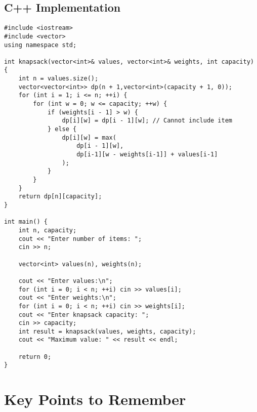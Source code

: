 \documentclass[14pt]{extarticle}
\begin{document}
\subsection{C++ Implementation}
\begin{lstlisting}[style=cpp, caption={0/1 Knapsack in C++}]
#include <iostream>
#include <vector>
using namespace std;

int knapsack(vector<int>& values, vector<int>& weights, int capacity) {
    int n = values.size();
    vector<vector<int>> dp(n + 1,vector<int>(capacity + 1, 0));
    for (int i = 1; i <= n; ++i) {
        for (int w = 0; w <= capacity; ++w) {
            if (weights[i - 1] > w) {
                dp[i][w] = dp[i - 1][w]; // Cannot include item
            } else {
                dp[i][w] = max(
                    dp[i - 1][w],
                    dp[i-1][w - weights[i-1]] + values[i-1]
                );
            }
        }
    }
    return dp[n][capacity];
}

int main() {
    int n, capacity;
    cout << "Enter number of items: ";
    cin >> n;

    vector<int> values(n), weights(n);

    cout << "Enter values:\n";
    for (int i = 0; i < n; ++i) cin >> values[i];
    cout << "Enter weights:\n";
    for (int i = 0; i < n; ++i) cin >> weights[i];
    cout << "Enter knapsack capacity: ";
    cin >> capacity;
    int result = knapsack(values, weights, capacity);
    cout << "Maximum value: " << result << endl;

    return 0;
}
\end{lstlisting}

\newpage
\section{Key Points to Remember}
\end{document}

